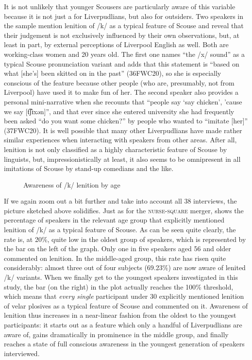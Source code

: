 It is not unlikely that younger Scousers are particularly aware of this variable because it is not just a  for Liverpudlians, but also for outsiders.
Two speakers in the sample mention lenition of /k/ as a typical feature of Scouse and reveal that their judgement is not exclusively influenced by their own observations, but, at least in part, by external perceptions of Liverpool English as well.
Both are working-class women and 20 years old.
The first one names ``the /x/ sound'' as a typical Scouse pronunciation variant and adds that this statement is ``based on what [she's] been skitted on in the past'' (36FWC20), so she is especially conscious of the feature because other people (who are, presumably, not from Liverpool) have used it to make fun of her.
The second speaker also provides a personal mini-narrative when she recounts that ``people say `say chicken', 'cause we say [t͡ʃɪxən]'', and that ever since she entered university she had frequently been asked ``do you want some chicken?'' by people who wanted to ``imitate [her]'' (37FWC20).
It is well possible that many other Liverpudlians have made rather similar experiences when interacting with speakers from other areas.
After all, lenition is not only classified as a highly characteristic feature of Scouse by linguists, but, impressionistically at least, it also seems to be omnipresent in all imitations of Scouse by stand-up comedians and the like.

\begin{figure}
	
		\resizebox{.49\linewidth}{!}{} 
	\caption{Awareness of /k/ lenition by age}
	\label{fig.aware.k}
\end{figure}

If we again zoom out a bit further and take into account all 38 interviews, the picture sketched above solidifies.
Just as for the \textsc{nurse}-\textsc{square} merger,  shows the percentage of speakers in the relevant age group that explicitly mentioned lenition of /k/ as a typical feature of Scouse.
As can be seen quite clearly, the rate is, at 20\%, quite low in the oldest group of speakers, which is represented by the bar on the left of the graph.
Only one in five speakers aged 56 and older commented on lenition.
In the middle-aged group, this rate has risen quite considerably: almost three out of four subjects (69.23\%) are now aware of lenited /k/ variants.
When we finally get to the youngest speakers investigated in this study, the bar (on the right) in the plot actually reaches the 100\% threshold, which means that \emph{every single} participant under 30 explicitly mentioned lenition of velar plosives as a typical feature of Scouse and commented on it.
Awareness of lenition thus increases in a near-linear fashion from the oldest to the youngest participants: it starts out as a feature which only a handful of Liverpudlians are aware of, gains dramatically in prominence in the middle group, and finally reaches a state of full conscious awareness in the youngest generation of speakers interviewed.

